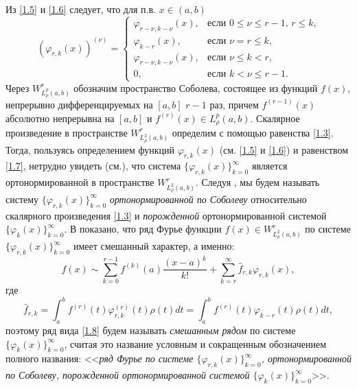  Из \eqref{1.5} и \eqref{1.6} следует, что для п.в. $x\in (a,b)$
 \begin{equation}\label{1.7}
(\varphi_{r,k}(x))^{(\nu)} =\begin{cases}\varphi_{r-\nu,k-\nu}(x),&\text{если $0\le\nu\le r-1$, $r\le k$,}\\
\varphi_{k-r}(x),&\text{если  $\nu=r\le k$,}\\
\varphi_{r-\nu,k-\nu}(x),&\text{если $\nu\le k< r$,}\\
0,&\text{если $k< \nu\le r-1$}.
  \end{cases}
\end{equation}
Через $W^r_{L^p_\rho(a,b)}$ обозначим пространство Соболева, состоящее из функций $f(x)$, непрерывно дифференцируемых на $[a,b]$ $r-1$ раз, причем $f^{(r-1)}(x)$ абсолютно непрерывна на $[a,b]$  и $f^{(r)}(x)\in L^p_\rho(a,b)$.
Скалярное произведение в пространстве $W^r_{L^2_\rho(a,b)}$ определим с помощью равенства \eqref{1.3}. Тогда, пользуясь определением функций  $\varphi_{r,k}(x)$ (см. \eqref{1.5} и \eqref{1.6}) и равенством  \eqref{1.7}, нетрудно увидеть (см.\cite{Shar20}),  что система $\{\varphi_{r,k}(x)\}_{k=0}^\infty$ является ортонормированной в пространстве $W^r_{L^2_\rho(a,b)}$. Следуя \cite{Shar20}, мы будем называть систему $\{\varphi_{r,k}(x)\}_{k=0}^\infty$ \textit{ ортонормированной по Соболеву } относительно скалярного произведения \eqref{1.3} и  \textit{ порожденной} ортонормированной системой $\{\varphi_{k}(x)\}_{k=0}^\infty$.
В \cite{Shar20} показано,  что ряд Фурье функции $f(x)\in W^r_{L^2_\rho(a,b)}$ по системе  $\{\varphi_{r,k}(x)\}_{k=0}^\infty$ имеет смешанный характер, а именно:
  \begin{equation}\label{1.8}
f(x)\sim \sum_{k=0}^{r-1} f^{(k)}(a)\frac{(x-a)^k}{k!}+ \sum_{k=r}^\infty \hat f_{r,k}\varphi_{r,k}(x),
\end{equation}
где
  \begin{equation}\label{1.9}
 \hat f_{r,k}=\int_a^b f^{(r)}(t) \varphi^{(r)}_{r,k}(t)\rho(t)dt=\int_a^b f^{(r)}(t) \varphi_{k-r}(t)\rho(t)dt,
\end{equation}
поэтому ряд  вида \eqref{1.8} будем  называть \textit{смешанным рядом} по  системе $\{\varphi_{k}(x)\}_{k=0}^\infty$, считая это название условным и сокращенным обозначением полного названия: <<\textit{ряд Фурье по системе  $\{\varphi_{r,k}(x)\}_{k=0}^\infty$, ортонормированной по Соболеву, порожденной ортонормированной системой $\{\varphi_{k}(x)\}_{k=0}^\infty$}>>.





